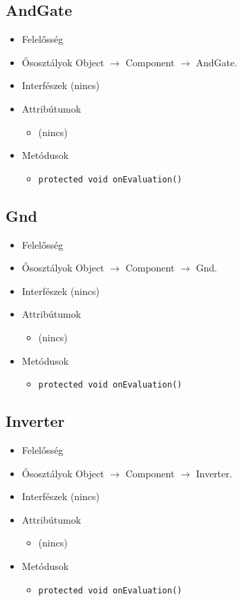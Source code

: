 \subsection{AndGate}
\begin{itemize}
\item Felelősség

\item Ősosztályok Object $\rightarrow{}$ Component $\rightarrow{}$ AndGate.
\item Interfészek (nincs)
\item Attribútumok $\ $
\begin{itemize}
\item (nincs)
\end{itemize}
\item Metódusok$\ $
\begin{itemize}
	\item \texttt{protected void onEvaluation()} 
\end{itemize}
\end{itemize}

\subsection{Gnd}
\begin{itemize}
\item Felelősség

\item Ősosztályok Object $\rightarrow{}$ Component $\rightarrow{}$ Gnd.
\item Interfészek (nincs)
\item Attribútumok $\ $
\begin{itemize}
\item (nincs)
\end{itemize}
\item Metódusok$\ $
\begin{itemize}
	\item \texttt{protected void onEvaluation()} 
\end{itemize}
\end{itemize}

\subsection{Inverter}
\begin{itemize}
\item Felelősség

\item Ősosztályok Object $\rightarrow{}$ Component $\rightarrow{}$ Inverter.
\item Interfészek (nincs)
\item Attribútumok $\ $
\begin{itemize}
\item (nincs)
\end{itemize}
\item Metódusok$\ $
\begin{itemize}
	\item \texttt{protected void onEvaluation()} 
\end{itemize}
\end{itemize}

